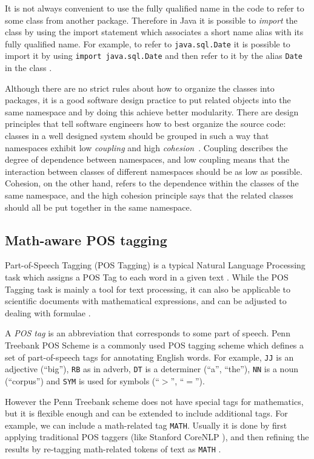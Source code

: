 It is not always convenient to use the fully qualified name in the code to
refer to some class from another package. Therefore in Java it is possible to
\emph{import} the class by using the import statement which associates
a short name alias with its fully qualified name.
For example, to refer to \texttt{java.sql.Date} it is possible to import
it by using \texttt{import java.sql.Date} and then refer to it by the alias
\texttt{Date} in the class \cite{gosling2014java}.


Although there are no strict rules about how to organize the classes into
packages, it is a good software design practice to put
related objects into the same namespace and by doing this achieve
better modularity. There are design principles that tell software engineers
how to best organize the source code: classes in a well designed system
should be grouped in such a way that namespaces
exhibit low \emph{coupling} and high \emph{cohesion}~\cite{larman2005applying}.
Coupling describes the degree of dependence between namespaces, and
low coupling means that the interaction between classes of different
namespaces should be as low as possible. Cohesion, on the other hand,
refers to the dependence within the classes of the same namespace,
and the high cohesion principle says that the related classes
should all be put together in the same namespace.


\subsection{Math-aware POS tagging} \label{sec:postagging}
Part-of-Speech Tagging (POS Tagging) is a typical Natural Language Processing
task which assigns a POS Tag to each word in a given text \cite{jurafsky2000speech}.
While the POS Tagging task is mainly a tool for text processing, it can
also be applicable to scientific documents with mathematical expressions,
and can be adjusted to dealing with formulae \cite{schoneberg2014pos}
\cite{pagael2014mlp}.

A \emph{POS tag} is an abbreviation that corresponds to some
part of speech. Penn Treebank POS Scheme \cite{santorini1990part} is
a commonly used POS tagging scheme which defines a set of part-of-speech tags
for annotating English words.
For example, \texttt{JJ} is an adjective (``big''), \texttt{RB} as in adverb,
\texttt{DT} is a determiner (``a'', ``the''), \texttt{NN} is a
noun (``corpus'') and \texttt{SYM} is used for symbols (``$>$'', ``$=$'').


However the Penn Treebank scheme does not have special tags for mathematics,
but it is flexible enough and can be extended to include additional tags.
For example, we can include a math-related tag \texttt{MATH}.
Usually it is done by first applying traditional POS taggers (like Stanford
CoreNLP \cite{manning2014stanford}), and then
refining the results by re-tagging math-related tokens of text as \texttt{MATH}
\cite{schoneberg2014pos}.


